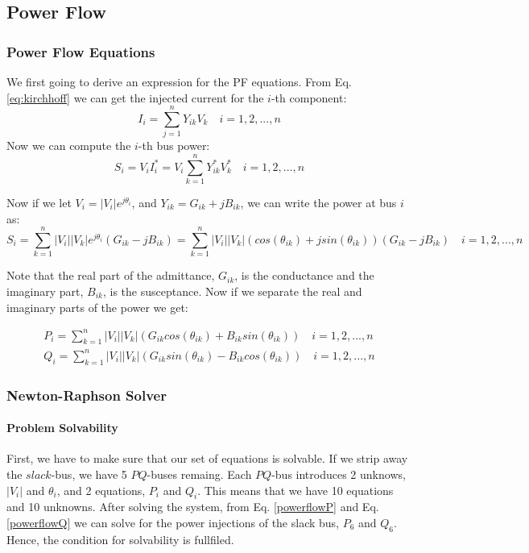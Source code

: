 \documentclass[a4paper,11pt, titlepage, twoside]{article}
\begin{document}
\subsection{Power Flow }
\subsubsection{Power Flow Equations}

We first going to derive an expression for the PF equations.
From Eq. \ref{eq:kirchhoff} we can get the injected current for the $i$-th component:
\begin{equation}
    I_i = \sum_{j=1}^{n} Y_{ik}V_k \quad i = 1,2,...,n
\end{equation}
Now we can compute the $i$-th bus power:
\begin{equation}
    S_i = V_iI_i^* = V_i\sum_{k=1}^{n} Y_{ik}^*V_k^* \quad i = 1,2,...,n
\end{equation}

Now if we let $V_i = |V_i|e^{j\theta_i}$, and $Y_{ik} = G_{ik} + jB_{ik}$, we can write the power at bus $i$ as:
\begin{equation}
    S_i = \sum_{k=1}^n|V_i||V_k|e^{j\theta_i}(G_{ik} - jB_{ik}) = \sum_{k=1}^n|V_i||V_k|(cos(\theta_{ik})+jsin(\theta_{ik}))(G_{ik} - jB_{ik}) \quad i = 1,2,...,n
\end{equation}

Note that the real part of the admittance, $G_{ik}$, is the conductance and the imaginary part, $B_{ik}$, is the susceptance. Now if we separate the real and imaginary parts of the power we get:

\begin{align}
    P_i= \sum_{k=1}^n|V_i||V_k|(G_{ik}cos(\theta_{ik}) + B_{ik}sin(\theta_{ik}))\label{powerflowP} \quad i= 1,2,...,n \\
    Q_i= \sum_{k=1}^n|V_i||V_k|(G_{ik}sin(\theta_{ik}) - B_{ik}cos(\theta_{ik}))\label{powerflowQ} \quad i= 1,2,...,n
\end{align}  


\subsubsection{Newton-Raphson Solver}\label{NRsolver}

\paragraph{Problem Solvability}

First, we have to make sure that our set of equations is solvable. If we strip away the $slack$-bus, we have 5 $PQ$-buses remaing. Each $PQ$-bus introduces 2 unknows, $|V_i|$ and $\theta_i$, and 2 equations, $P_i$ and $Q_i$. This means that we have 10 equations and 10 unknowns. 
After solving the system, from  Eq. \ref{powerflowP} and Eq. \ref{powerflowQ} we can solve for the power injections of the slack bus, $P_6$ and $Q_6$. Hence, the condition for solvability is fullfiled.
\end{document}
